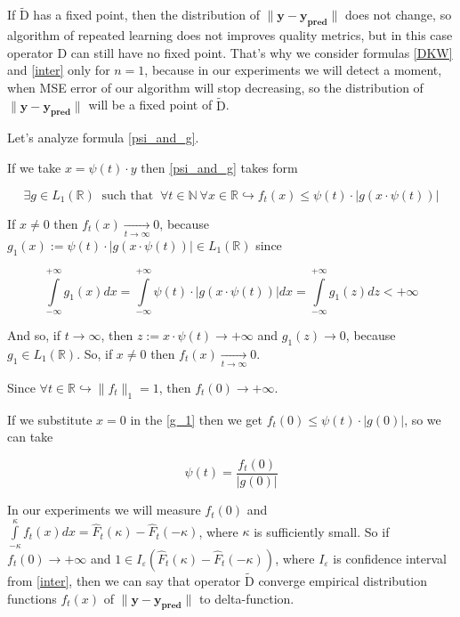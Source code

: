 \documentclass{article}
\begin{document}
    If $\widetilde{\text{D}}$ has a fixed point, then the distribution of $\|\mathbf{y} - \mathbf{y_{\text{pred}}}\|$ does not change, so algorithm of repeated learning does not improves quality metrics, but in this case operator $\text{D}$ can still have no fixed point. That's why we consider formulas \eqref{DKW} and \eqref{inter} only for $n=1$, because in our experiments we will detect a moment, when MSE error of our algorithm will stop decreasing, so the distribution of $\|\mathbf{y} - \mathbf{y_{\text{pred}}}\|$ will be a fixed point of $\widetilde{\text{D}}$.

    Let's analyze formula \eqref{psi_and_g}. 
    
    If we take $x = \psi(t) \cdot y$ then \eqref{psi_and_g} takes form 
    
    \begin{equation} \label{g_1}
            \exists g \in L_1(\mathbb{R}) ~\text{ such that }~ \forall t \in \mathbb{N} ~\forall x \in \mathbb{R} \hookrightarrow f_t\left(x\right) \leq \psi(t) \cdot |g(x \cdot \psi(t))|
    \end{equation}

    If $x \neq 0$ then $f_t(x) \underset{t \to \infty}{\longrightarrow} 0$, because $g_1(x) := \psi(t) \cdot |g(x \cdot \psi(t))| \in L_1(\mathbb{R})$ since

    \begin{equation*}
        \int\limits_{-\infty}^{+\infty} g_1(x) dx = \int\limits_{-\infty}^{+\infty} \psi(t) \cdot |g(x \cdot \psi(t))| dx = \int\limits_{-\infty}^{+\infty} g_1(z) dz < +\infty
    \end{equation*}

    And so, if $t \to \infty$, then $z := x \cdot \psi(t) \to +\infty$ and $g_1(z) \to 0$, because $g_1 \in L_1(\mathbb{R})$. So, if $x \neq 0$ then $f_t(x) \underset{t \to \infty}{\longrightarrow} 0$.

    Since $\forall t \in \mathbb{R} \hookrightarrow \|f_t\|_1 = 1$, then $f_t(0) \to +\infty$.

    If we substitute $x = 0$ in the \eqref{g_1} then we get $f_t(0) \leq \psi(t) \cdot |g(0)|$, so we can take

    \begin{equation}
        \psi(t) = \dfrac{f_t(0)}{|g(0)|}
    \end{equation}

    In our experiments we will measure $f_t(0)$ and $\int\limits_{-\kappa}^{\kappa}f_t(x)dx = \hat{F}_t(\kappa) - \hat{F}_t(-\kappa)$, where $\kappa$ is sufficiently small. So if $f_t(0) \to +\infty$ and $1 \in I_{\varepsilon}(\hat{F}_t(\kappa) - \hat{F}_t(-\kappa))$, where $I_{\varepsilon}$ is confidence interval from \eqref{inter}, then we can say that operator $\widetilde{\text{D}}$ converge empirical distribution functions $f_t(x)$ of $\|\mathbf{y} - \mathbf{y_{\text{pred}}}\|$ to delta-function.
    
\end{document}
